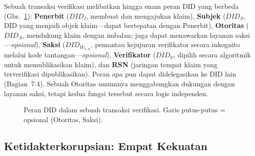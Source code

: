 \documentclass[11pt,a4paper,twocolumn]{article}
\begin{document}
Sebuah transaksi verifikasi melibatkan hingga enam peran DID yang berbeda (Gbr.~\ref{fig:roles}): \textbf{Penerbit} ($DID_I$, membuat dan mengajukan klaim), \textbf{Subjek} ($DID_S$, DID yang menjadi objek klaim---dapat bertepatan dengan Penerbit), \textbf{Otoritas} ($DID_A$, mendukung klaim dengan imbalan; juga dapat menawarkan layanan saksi---\emph{opsional}), \textbf{Saksi} ($DID_{W_{1..n}}$, pemantau kejujuran verifikator secara inkognito melalui kode tantangan---\emph{opsional}), \textbf{Verifikator} ($DID_V$, dipilih secara algoritmik untuk memublikasikan klaim), dan \textbf{RSN} (jaringan tempat klaim yang terverifikasi dipublikasikan). Peran apa pun dapat didelegasikan ke DID lain (Bagian~7.4). Sebuah Otoritas umumnya menggabungkan dukungan dengan layanan saksi, tetapi kedua fungsi tersebut secara logis independen.

\begin{figure}[ht]
\centering
{}
\caption{Peran DID dalam sebuah transaksi verifikasi. Garis putus-putus = opsional (Otoritas, Saksi).}
\label{fig:roles}
\end{figure}

\subsection{Ketidakterkorupsian: Empat Kekuatan}
\end{document}
